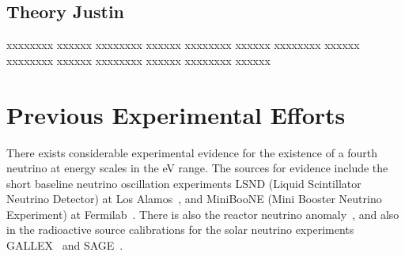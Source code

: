 \documentclass[aps,prd,twocolumn,nofootinbib]{revtex4-1}
\begin{document}
\subsection{Theory Justin}
xxxxxxxx xxxxxx xxxxxxxx xxxxxx xxxxxxxx xxxxxx xxxxxxxx xxxxxx xxxxxxxx xxxxxx xxxxxxxx xxxxxx xxxxxxxx xxxxxx
\section{Previous Experimental Efforts}
There exists considerable experimental evidence for the existence of a fourth neutrino at energy scales in the eV range. The sources for evidence include the short baseline neutrino oscillation experiments LSND (Liquid Scintillator Neutrino Detector) at Los Alamos~\cite{LSND}, and MiniBooNE (Mini Booster Neutrino Experiment) at Fermilab~\cite{mini1,mini2}. There is also the reactor neutrino anomaly~\cite{reactor_anom1}, and also in the radioactive source calibrations for the solar neutrino experiments GALLEX~\cite{gallex1,gallex2} and SAGE~\cite{sage1,sage2}.
\end{document}
